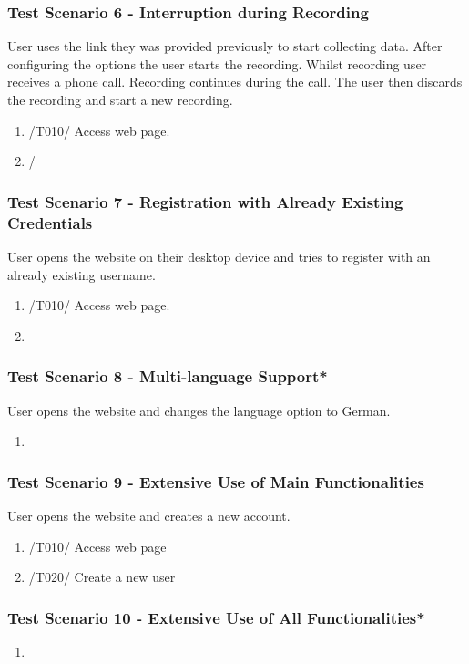 \subsubsection{Test Scenario 6 - Interruption during Recording}
User uses the link they was provided previously to start collecting data. After configuring the options the user starts the recording. Whilst recording user receives a phone call. Recording continues during the call. The user then discards the recording and start a new recording. 
\begin{enumerate}
    \item /T010/ Access web page.
    \item /
\end{enumerate}
\subsubsection{Test Scenario 7 - Registration with Already Existing Credentials}
User opens the website on their desktop device and tries to register with an already existing username.
\begin{enumerate}
    \item /T010/ Access web page.
    \item 
\end{enumerate}
\subsubsection{Test Scenario 8 - Multi-language Support*}
User opens the website and changes the language option to German. 
\begin{enumerate}
    \item 
\end{enumerate}
\subsubsection{Test Scenario 9 - Extensive Use of Main Functionalities}
User opens the website and creates a new account. 
\begin{enumerate}
    \item /T010/ Access web page
    \item /T020/ Create a new user
\end{enumerate}
\subsubsection{Test Scenario 10 - Extensive Use of All Functionalities*}

\begin{enumerate}
    \item 
\end{enumerate}
